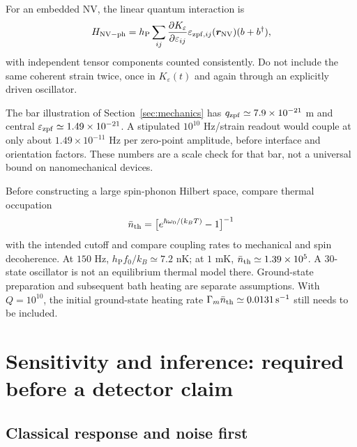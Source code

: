 \documentclass[a4paper,11pt]{article}
\newcommand{\hp}{h_{\mathrm P}}
\newcommand{\eps}{\varepsilon}
\begin{document}
For an embedded NV, the linear quantum interaction is
\begin{equation}
 H_{\rm NV-ph}=\hp\sum_{ij}\frac{\partial K_\eps}{\partial\eps_{ij}}
 \eps_{{\rm zpf},ij}(\bm r_{\rm NV})(b+b^\dagger),
\end{equation}
with independent tensor components counted consistently. Do not include the same coherent strain twice, once in $K_\eps(t)$ and again through an explicitly driven oscillator.

The bar illustration of Section~\ref{sec:mechanics} has $q_{\rm zpf}\simeq7.9\times10^{-21}$ m and central $\eps_{\rm zpf}\simeq1.49\times10^{-21}$. A stipulated $10^{10}$ Hz/strain readout would couple at only about $1.49\times10^{-11}$ Hz per zero-point amplitude, before interface and orientation factors. These numbers are a scale check for that bar, not a universal bound on nanomechanical devices.

Before constructing a large spin-phonon Hilbert space, compare thermal occupation
\begin{equation}
 \bar n_{\rm th}=\bigl[e^{\hbar\omega_0/(k_BT)}-1\bigr]^{-1}
\end{equation}
with the intended cutoff and compare coupling rates to mechanical and spin decoherence. At $150$ Hz, $\hp f_0/k_B\simeq7.2$ nK; at $1$ mK, $\bar n_{\rm th}\simeq1.39\times10^5$. A $30$-state oscillator is not an equilibrium thermal model there. Ground-state preparation and subsequent bath heating are separate assumptions. With $Q=10^{10}$, the initial ground-state heating rate $\Gamma_m\bar n_{\rm th}\simeq0.0131\,\mathrm{s}^{-1}$ still needs to be included.

\section{Sensitivity and inference: required before a detector claim}
\label{sec:noise}

\subsection{Classical response and noise first}
\end{document}
